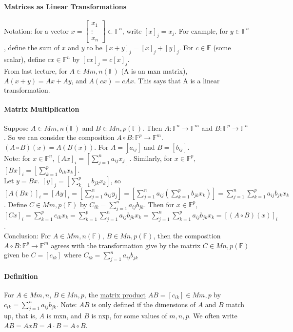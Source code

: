 \documentclass[10pt,letter]{article}
\begin{document}
\section*{}

\paragraph{Matrices as Linear Transformations}
Notation: for a vector $x=\begin{bmatrix}x_1\\\vdots\\x_n\end{bmatrix}\subset\mathbb{F}^n$, write $[x]_j=x_j$. For example, for $y\in\mathbb{F}^n$, define the sum of $x$ and $y$ to be $[x+y]_j=[x]_j+[y]_j$. For $c\in\mathbb{F}$ (some scalar), define $cx\in\mathbb{F}^n$ by $[cx]_j=c[x]_j$. \\ 
From last lecture, for $A\in Mm,n(\mathbb{F})$ (A is an mxn matrix), $A(x+y)=Ax+Ay$, and $A(cx)=cAx$. This says that A is a linear transformation. 

\paragraph{Matrix Multiplication}
Suppose $A\in Mm,n(\mathbb{F})$ and $B\in Mn,p(\mathbb{F})$. Then $A:\mathbb{F}^n\rightarrow\mathbb{F}^m$ and $B:\mathbb{F}^p\rightarrow\mathbb{F}^n$. So we can consider the composition $A\circ B:\mathbb{F}^p\rightarrow\mathbb{F}^m$. $(A\circ B)(x)=A(B(x))$. For $A=[a_{ij}]$ and $B=[b_{ij}]$. \\ 
Note: for $x\in\mathbb{F}^n$, $[Ax]_i=[\sum_{j=1}^na_{ij}x_j]$. Similarly, for $x\in\mathbb{F}^p$, $[Bx]_i=[\sum_{k=1}^{p}b_{ik}x_k]$. \\ 
Let $y=Bx$. $[y]_j=[\sum_{k=1}^{p}b_{jk}x_{k}]$, so $[A(Bx)]_i=[Ay]_i=[\sum_{j=1}^{n}a_{ij}y_{j}]=[\sum_{j=1}^na_{ij}(\sum_{k=1}^pb_{jk}x_k)]=\sum_{j=1}^{n}\sum_{k=1}^pa_{ij}b_{jk}x_k$. Define $C\in Mm,p(\mathbb{F})$ by $C_{ik}=\sum_{j=1}^{n}a_{ij}b_{jk}$. Then for $x\in\mathbb{F}^p$, $[Cx]_i=\sum_{k=1}^pc_{ik}x_k=\sum_{k=1}^{p}\sum_{j=1}^{n}a_{ij}b_{jk}x_k=\sum_{j=1}^n\sum_{k=1}^pa_{ij}b_{jk}x_k=[(A\circ B)(x)]_i$. \\ 
Conclusion: For $A\in Mm,n(\mathbb{F})$, $B\in Mn,p(\mathbb{F})$, then the composition $A\circ B: \mathbb{F}^p\rightarrow\mathbb{F}^m$ agrees with the transformation give by the matrix $C\in Mn,p(\mathbb{F})$ given be $C=[c_{ik}]$ where $C_{ik}=\sum_{j=1}^{n}a_{ij}b_{jk}$

\paragraph{Definition}
For $A\in Mm,n$, $B\in Mn,p$, the \underline{matrix product} $AB=[c_{ik}]\in Mm,p$ by $c_{ik}=\sum_{j=1}^na_{ij}b_{jk}$. Note: $AB$ is only defined if the dimensions of $A$ and $B$ match up, that is, $A$ is mxn, and $B$ is nxp, for some values of $m,n,p$. We often write $AB=AxB=A\cdot B=A\circ B$. 
\end{document}
